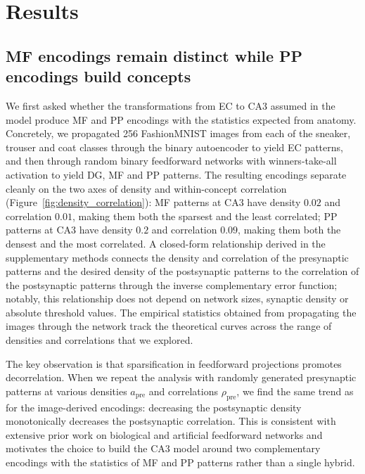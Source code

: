\documentclass[11pt]{article}
\begin{document}
\section{Results}

\subsection{MF encodings remain distinct while PP encodings build concepts}

We first asked whether the transformations from EC to CA3 assumed in the
model produce MF and PP encodings with the statistics expected from
anatomy. Concretely, we propagated 256 FashionMNIST images from each of
the sneaker, trouser and coat classes through the binary autoencoder to
yield EC patterns, and then through random binary feedforward networks with
winners-take-all activation to yield DG, MF and PP patterns. The resulting
encodings separate cleanly on the two axes of density and within-concept
correlation (Figure~\ref{fig:density_correlation}): MF patterns at CA3 have
density $0.02$ and correlation $0.01$, making them both the sparsest and
the least correlated; PP patterns at CA3 have density $0.2$ and correlation
$0.09$, making them both the densest and the most correlated. A closed-form
relationship derived in the supplementary methods connects the density and
correlation of the presynaptic patterns and the desired density of the
postsynaptic patterns to the correlation of the postsynaptic patterns
through the inverse complementary error function; notably, this
relationship does not depend on network sizes, synaptic density or absolute
threshold values. The empirical statistics obtained from propagating the
images through the network track the theoretical curves across the range
of densities and correlations that we explored.

The key observation is that sparsification in feedforward projections
promotes decorrelation. When we repeat the analysis with randomly generated
presynaptic patterns at various densities $a_{\mathrm{pre}}$ and
correlations $\rho_{\mathrm{pre}}$, we find the same trend as for the
image-derived encodings: decreasing the postsynaptic density monotonically
decreases the postsynaptic correlation. This is consistent with extensive
prior work on biological and artificial feedforward networks
\cite{olshausen1996emergence,leutgeb2007pattern} and motivates the choice
to build the CA3 model around two complementary encodings with the
statistics of MF and PP patterns rather than a single hybrid.
\end{document}
